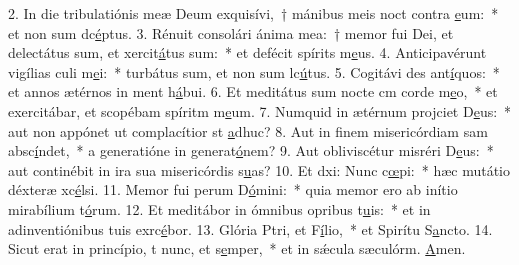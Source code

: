 2. In die tribulatiónis meæ Deum exquisívi,~† mánibus meis noct contra \uline{e}um:~* et non sum dc\uline{é}ptus.
3. Rénuit consolári ánima mea:~† memor fui Dei, et delectátus sum, et xercit\uline{á}tus sum:~* et defécit spírits m\uline{e}us.
4. Anticipavérunt vigílias culi m\uline{e}i:~* turbátus sum, et non sum lc\uline{ú}tus.
5. Cogitávi des ant\uline{í}quos:~* et annos ætérnos in ment h\uline{á}bui.
6. Et meditátus sum nocte cm corde m\uline{e}o,~* et exercitábar, et scopébam spíritm m\uline{e}um.
7. Numquid in ætérnum projciet D\uline{e}us:~* aut non appónet ut complacítior st \uline{a}dhuc?
8. Aut in finem misericórdiam sam absc\uline{í}ndet,~* a generatióne in generat\uline{ó}nem?
9. Aut obliviscétur misréri D\uline{e}us:~* aut continébit in ira sua misericórdis s\uline{u}as?
10. Et dxi: Nunc c\uline{œ}pi:~* hæc mutátio déxteræ xc\uline{é}lsi.
11. Memor fui perum D\uline{ó}mini:~* quia memor ero ab inítio mirabílium t\uline{ó}rum.
12. Et meditábor in ómnibus opribus t\uline{u}is:~* et in adinventiónibus tuis exrc\uline{é}bor.
13. Glória Ptri, et F\uline{í}lio,~* et Spirítu S\uline{a}ncto.
14. Sicut erat in princípio, t nunc, et s\uline{e}mper,~* et in sǽcula sæculórm. \uline{A}men.

